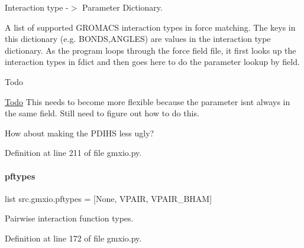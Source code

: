 Interaction type -\/$>$ Parameter Dictionary. 

A list of supported G\+R\+O\+M\+A\+CS interaction types in force matching. The keys in this dictionary (e.\+g. \textquotesingle{}B\+O\+N\+DS\textquotesingle{},\textquotesingle{}A\+N\+G\+L\+ES\textquotesingle{}) are values in the interaction type dictionary. As the program loops through the force field file, it first looks up the interaction types in \textquotesingle{}fdict\textquotesingle{} and then goes here to do the parameter lookup by field. \begin{DoxyRefDesc}{Todo}
\item[\hyperlink{todo__todo000009}{Todo}]This needs to become more flexible because the parameter isn\textquotesingle{}t always in the same field. Still need to figure out how to do this. 

How about making the P\+D\+I\+HS less ugly? \end{DoxyRefDesc}


Definition at line 211 of file gmxio.\+py.

\mbox{\label{namespacesrc_1_1gmxio_aa2eb9673c40c470f5b83b9a6834bed91}} 
\paragraph{\texorpdfstring{pftypes}{pftypes}}
{\footnotesize\ttfamily list src.\+gmxio.\+pftypes = \mbox{[}None, \textquotesingle{}V\+P\+A\+IR\textquotesingle{}, \textquotesingle{}V\+P\+A\+I\+R\+\_\+\+B\+H\+AM\textquotesingle{}\mbox{]}}



Pairwise interaction function types. 



Definition at line 172 of file gmxio.\+py.

